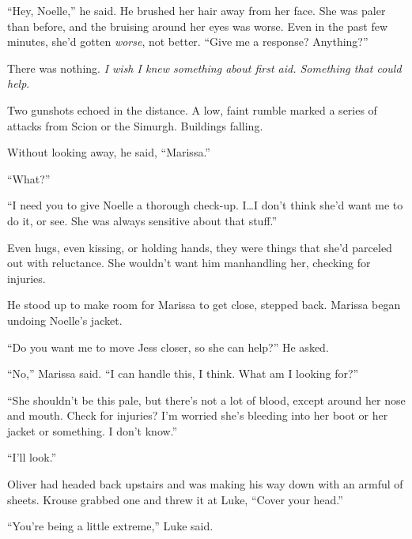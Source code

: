 ``Hey, Noelle,'' he said.  He brushed her hair away from her face.  She was paler than before, and the bruising  around her eyes was worse.  Even in the past few minutes, she'd gotten \emph{worse}, not better.  ``Give me a response?  Anything?''



There was nothing.  \emph{I wish I knew something about first aid.  Something that could help}.



Two gunshots echoed in the distance.  A low, faint rumble marked a series of attacks from Scion or the Simurgh.  Buildings falling.



Without looking away, he said, ``Marissa.''



``What?''



``I need you to give Noelle a thorough check-up.  I\ldots I don't think she'd want me to do it, or see.  She was always sensitive about that stuff.''



Even hugs, even kissing, or holding hands, they were things that she'd parceled out with reluctance.  She wouldn't want him manhandling her, checking for injuries.



He stood up to make room for Marissa to get close, stepped back.  Marissa began undoing Noelle's jacket.



``Do you want me to move Jess closer, so she can help?''  He asked.



``No,'' Marissa said.  ``I can handle this, I think.  What am I looking for?''



``She shouldn't be this pale, but there's not a lot of blood, except around her nose and mouth.  Check for injuries?  I'm worried she's bleeding into her boot or her jacket or something.  I don't know.''



``I'll look.''



Oliver had headed back upstairs and was making his way down with an armful of sheets.  Krouse grabbed one and threw it at Luke, ``Cover your head.''



``You're being a little extreme,'' Luke said.




